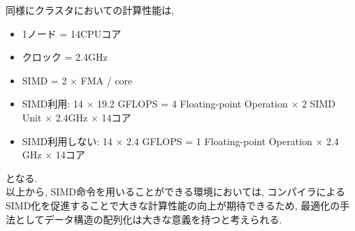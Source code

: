 同様にクラスタにおいての計算性能は,\\
\begin{itemize}
  \item 1ノード = 14CPUコア
  \item クロック = 2.4GHz
  \item SIMD = 2 × FMA / core
  \item SIMD利用: 14 × 19.2 GFLOPS = 4 Floating-point Operation × 2 SIMD Unit × 2.4GHz × 14コア
  \item SIMD利用しない: 14 × 2.4 GFLOPS = 1 Floating-point Operation × 2.4 GHz × 14コア
\end{itemize}
となる.\\

以上から, SIMD命令を用いることができる環境においては, コンパイラによるSIMD化を促進することで大きな計算性能の向上が期待できるため, 
最適化の手法としてデータ構造の配列化は大きな意義を持つと考えられる.
